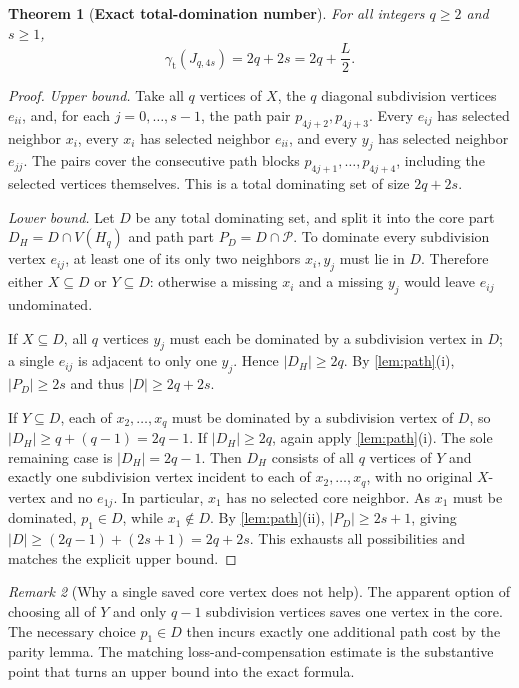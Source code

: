 \documentclass[11pt,a4paper]{article}
\newtheorem{theorem}{Theorem}[section]
\theoremstyle{definition}
\theoremstyle{remark}
\newtheorem{remark}[theorem]{Remark}
\newcommand{\gam}{\gamma_{\mathrm t}}
\begin{document}
\begin{theorem}[\textbf{Exact total-domination number}]\label{thm:gamma}
For all integers $q\ge2$ and $s\ge1$,
\begin{equation}\label{eq:gammaexact}
\boxed{\gam(J_{q,4s})=2q+2s=2q+\frac L2.}
\end{equation}
\end{theorem}
\begin{proof}
\emph{Upper bound.} Take all $q$ vertices of $X$, the $q$ diagonal subdivision vertices $e_{ii}$, and, for each $j=0,\ldots,s-1$, the path pair $p_{4j+2},p_{4j+3}$. Every $e_{ij}$ has selected neighbor $x_i$, every $x_i$ has selected neighbor $e_{ii}$, and every $y_j$ has selected neighbor $e_{jj}$. The pairs cover the consecutive path blocks $p_{4j+1},\ldots,p_{4j+4}$, including the selected vertices themselves. This is a total dominating set of size $2q+2s$.

\emph{Lower bound.} Let $D$ be any total dominating set, and split it into the core part $D_H=D\cap V(H_q)$ and path part $P_D=D\cap\mathcal P$. To dominate every subdivision vertex $e_{ij}$, at least one of its only two neighbors $x_i,y_j$ must lie in $D$. Therefore either $X\subseteq D$ or $Y\subseteq D$: otherwise a missing $x_i$ and a missing $y_j$ would leave $e_{ij}$ undominated.

If $X\subseteq D$, all $q$ vertices $y_j$ must each be dominated by a subdivision vertex in $D$; a single $e_{ij}$ is adjacent to only one $y_j$. Hence $|D_H|\ge2q$. By \cref{lem:path}(i), $|P_D|\ge2s$ and thus $|D|\ge2q+2s$.

If $Y\subseteq D$, each of $x_2,\ldots,x_q$ must be dominated by a subdivision vertex of $D$, so $|D_H|\ge q+(q-1)=2q-1$. If $|D_H|\ge2q$, again apply \cref{lem:path}(i). The sole remaining case is $|D_H|=2q-1$. Then $D_H$ consists of all $q$ vertices of $Y$ and exactly one subdivision vertex incident to each of $x_2,\ldots,x_q$, with no original $X$-vertex and no $e_{1j}$. In particular, $x_1$ has no selected core neighbor. As $x_1$ must be dominated, $p_1\in D$, while $x_1\notin D$. By \cref{lem:path}(ii), $|P_D|\ge2s+1$, giving $|D|\ge(2q-1)+(2s+1)=2q+2s$. This exhausts all possibilities and matches the explicit upper bound.
\end{proof}
\begin{remark}[Why a single saved core vertex does not help]
The apparent option of choosing all of $Y$ and only $q-1$ subdivision vertices saves one vertex in the core. The necessary choice $p_1\in D$ then incurs exactly one additional path cost by the parity lemma. The matching loss-and-compensation estimate is the substantive point that turns an upper bound into the exact formula.
\end{remark}
\end{document}
